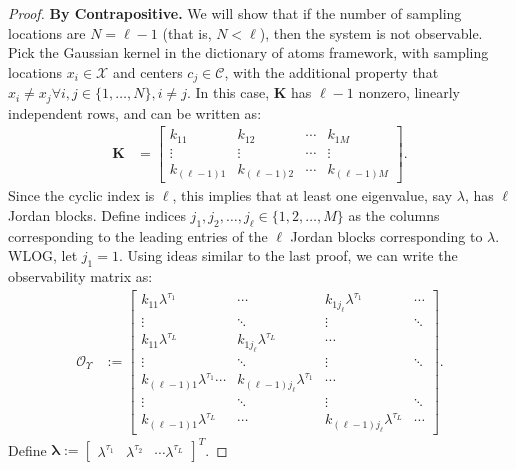 \documentclass[letterpaper,12pt,peerreviewca,draftcls]{IEEEtran}
\newcommand{\la}{\lambda}
\newcommand{\kernel}{k}
\newcommand{\eval}{\la}
\newcommand{\empK}{\ensuremath{K}}
\newcommand{\sampSet}{\mathcal{X}}
\newcommand{\nsamp}{N}
\newcommand{\ncent}{M}
\newcommand{\shCent}{\mathcal{C}}
\newcommand{\Obs}{\mathcal{O}}
\newcommand{\otime}{L}
\newcommand{\Tset}{\Upsilon}
\newcommand{\minmeas}{\ell}
\newcommand{\empKShadFull}{\mathbf{\empK}}
\newcommand{\tindex}{\tau}
\newcommand{\evalvec}{\boldsymbol{\eval}}
\begin{document}
\begin{proof}
	\textbf{By Contrapositive.} We will show that if the number of sampling locations are $ \nsamp=\ell-1 $ (that is, $ \nsamp < \ell$), then the system is not observable. Pick the Gaussian kernel in the dictionary of atoms framework,
	with sampling locations $x_i\in\sampSet$ and centers $c_j\in\shCent$, with the additional 
	property that $x_i\neq x_j \forall i,j\in\{1,\dots,\nsamp\}, i\neq j$.
	In this case, 
	$\empKShadFull$ has $\minmeas-1$ nonzero, linearly independent rows, and can be written as:
	\begin{align*}
	\empKShadFull &= \begin{bmatrix}
	k_{11} & k_{12} & \cdots & k_{1\ncent} \\
	\vdots & \vdots & \cdots & \vdots \\
	k_{(\minmeas-1)1} & k_{(\minmeas-1)2} & \cdots & k_{(\minmeas-1)\ncent} 
	\end{bmatrix}.
	\end{align*}
	Since the cyclic index is $\minmeas$, this implies that at least one eigenvalue, say $\eval$, has $\minmeas$ Jordan blocks. 
	Define indices $j_1, j_2, \dots, j_{\minmeas} \in \{1,2,\dots,\ncent\}$ as the columns corresponding to the leading entries of the $\minmeas$ Jordan blocks corresponding to $\eval$. WLOG, let $j_1 = 1$. Using ideas similar to the last proof, we can write the observability matrix as:
	\begin{align*}
	\Obs_{\Tset}
	&:= 
	\begin{bmatrix}
	\kernel_{11}\eval^{\tindex_1}  & \cdots & \kernel_{1j_{\minmeas}}\eval^{\tindex_1} & \cdots\\
	\vdots & \ddots &\vdots & \ddots\\
	\kernel_{11}\eval^{\tindex_{\otime}}  & \kernel_{1j_{\minmeas}}\eval^{\tindex_{\otime}} & \cdots\\
	\vdots & \ddots & \vdots & \ddots\\
	\kernel_{(\minmeas-1)1}\eval^{\tindex_1}  \cdots & \kernel_{(\minmeas-1)j_{\minmeas}}\eval^{\tindex_1} & \cdots\\
	\vdots & \ddots &\vdots & \ddots\\
	\kernel_{(\minmeas-1)1}\eval^{\tindex_{\otime}}  & \cdots & \kernel_{(\minmeas-1)j_{\minmeas}}\eval^{\tindex_{\otime}} & \cdots
	\end{bmatrix}.
	\end{align*}
	Define $\evalvec:= \begin{bmatrix}\eval^{\tindex_1} & \eval^{\tindex_2} & \cdots \eval^{\tindex_{\otime}}\end{bmatrix}^T$. 

\end{proof}
\end{document}
